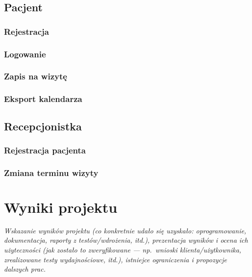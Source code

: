 \documentclass[polish,12pt]{aghthesis}
\begin{document}
\subsection{Pacjent}
\subsubsection{Rejestracja}{}
\subsubsection{Logowanie}{}
\subsubsection{Zapis na wizytę}{}
\subsubsection{Eksport kalendarza}{}
\subsection{Recepcjonistka}
\subsubsection{Rejestracja pacjenta}{}
\subsubsection{Zmiana terminu wizyty}{}


\section{Wyniki projektu}

\label{sec:wyniki-projektu}

\emph{Wskazanie wyników projektu (co konkretnie udało się uzyskało:
  oprogramowanie, dokumentacja, raporty z testów/wdrożenia, itd.), prezentacja wyników
  i ocena ich użyteczności (jak zostało to zweryfikowane --- np.\ wnioski
  klienta/użytkownika, zrealizowane testy wydajnościowe, itd.),
  istniejce ograniczenia i propozycje dalszych prac.}
  

\nocite{artykul2011,ksiazka2011,narzedzie2011,projekt2011}


\end{document}
